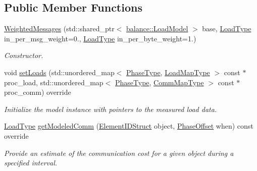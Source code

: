 \subsection*{Public Member Functions}
\begin{DoxyCompactItemize}
\item 
\hyperlink{structvt_1_1vrt_1_1collection_1_1balance_1_1_weighted_messages_a702340c1de974e4e616057a776b903d6}{Weighted\+Messages} (std\+::shared\+\_\+ptr$<$ \hyperlink{structvt_1_1vrt_1_1collection_1_1balance_1_1_load_model}{balance\+::\+Load\+Model} $>$ base, \hyperlink{namespacevt_a8fb51741340b87d7aaee0bef60e9896b}{Load\+Type} in\+\_\+per\+\_\+msg\+\_\+weight=0., \hyperlink{namespacevt_a8fb51741340b87d7aaee0bef60e9896b}{Load\+Type} in\+\_\+per\+\_\+byte\+\_\+weight=1.)
\begin{DoxyCompactList}\small\item\em Constructor. \end{DoxyCompactList}\item 
void \hyperlink{structvt_1_1vrt_1_1collection_1_1balance_1_1_weighted_messages_ad0e6b88668ac59f4fb376a2dba81e593}{set\+Loads} (std\+::unordered\+\_\+map$<$ \hyperlink{namespacevt_a46ce6733d5cdbd735d561b7b4029f6d7}{Phase\+Type}, \hyperlink{namespacevt_1_1vrt_1_1collection_1_1balance_a5339303db2e1ce964d783a53fd74e6b1}{Load\+Map\+Type} $>$ const $\ast$proc\+\_\+load, std\+::unordered\+\_\+map$<$ \hyperlink{namespacevt_a46ce6733d5cdbd735d561b7b4029f6d7}{Phase\+Type}, \hyperlink{namespacevt_1_1vrt_1_1collection_1_1balance_a01ee1fb0ae2da1d2ab7fdca3be9ae351}{Comm\+Map\+Type} $>$ const $\ast$proc\+\_\+comm) override
\begin{DoxyCompactList}\small\item\em Initialize the model instance with pointers to the measured load data. \end{DoxyCompactList}\item 
\hyperlink{namespacevt_a8fb51741340b87d7aaee0bef60e9896b}{Load\+Type} \hyperlink{structvt_1_1vrt_1_1collection_1_1balance_1_1_weighted_messages_a5f5d0c9259b71f373beda65ba5585b87}{get\+Modeled\+Comm} (\hyperlink{namespacevt_1_1vrt_1_1collection_1_1balance_a9f5b53fafb270212279a4757d2c4cd28}{Element\+I\+D\+Struct} object, \hyperlink{structvt_1_1vrt_1_1collection_1_1balance_1_1_phase_offset}{Phase\+Offset} when) const override
\begin{DoxyCompactList}\small\item\em Provide an estimate of the communication cost for a given object during a specified interval. \end{DoxyCompactList}\end{DoxyCompactItemize}
